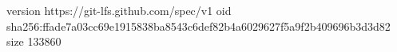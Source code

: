 version https://git-lfs.github.com/spec/v1
oid sha256:ffade7a03cc69e1915838ba8543c6def82b4a6029627f5a9f2b409696b3d3d82
size 133860
